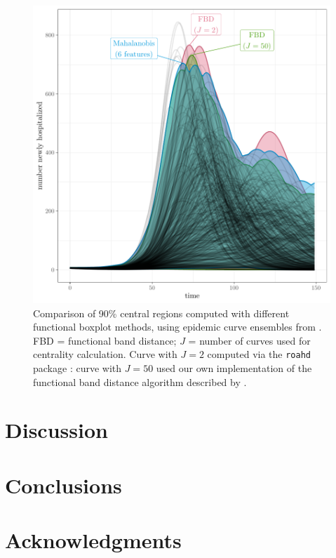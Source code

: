 \documentclass[fleqn,10pt,lineno]{wlpeerj}
\begin{document}
\begin{figure}[ht]\centering
  \includegraphics[width=\linewidth]{scripts/cent_plot.pdf}
  \caption{Comparison of 90\% central regions computed with
    different functional boxplot methods, using epidemic curve ensembles from \juul. FBD = functional band distance; $J$ = number of curves used for centrality calculation. Curve with $J=2$ computed via the \texttt{roahd} package \citep{roahd}: curve with $J=50$ used our own implementation of the functional band distance algorithm described by \juul.
  }
  \label{p.a}
\end{figure}
 
\section*{Discussion}



\section*{Conclusions}

\section*{Acknowledgments}


\end{document}
